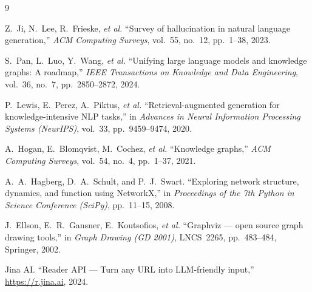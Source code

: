 \documentclass[12pt,a4paper]{article}
\begin{document}
\begin{thebibliography}{9}

Z.~Ji, N.~Lee, R.~Frieske, \textit{et al.}
``Survey of hallucination in natural language generation,'' \textit{ACM Computing Surveys}, vol.~55, no.~12, pp.~1--38, 2023.

S.~Pan, L.~Luo, Y.~Wang, \textit{et al.}
``Unifying large language models and knowledge graphs: A roadmap,'' \textit{IEEE Transactions on Knowledge and Data Engineering}, vol.~36, no.~7, pp.~2850--2872, 2024.

P.~Lewis, E.~Perez, A.~Piktus, \textit{et al.}
``Retrieval-augmented generation for knowledge-intensive NLP tasks,'' in \textit{Advances in Neural Information Processing Systems (NeurIPS)}, vol.~33, pp.~9459--9474, 2020.

A.~Hogan, E.~Blomqvist, M.~Cochez, \textit{et al.}
``Knowledge graphs,'' \textit{ACM Computing Surveys}, vol.~54, no.~4, pp.~1--37, 2021.

A.~A.~Hagberg, D.~A.~Schult, and P.~J.~Swart.
``Exploring network structure, dynamics, and function using NetworkX,'' in \textit{Proceedings of the 7th Python in Science Conference (SciPy)}, pp.~11--15, 2008.

J.~Ellson, E.~R.~Gansner, E.~Koutsofios, \textit{et al.}
``Graphviz --- open source graph drawing tools,'' in \textit{Graph Drawing (GD 2001)}, LNCS~2265, pp.~483--484, Springer, 2002.

Jina AI.
``Reader API --- Turn any URL into LLM-friendly input,'' \url{https://r.jina.ai}, 2024.

\end{thebibliography}
\end{document}
